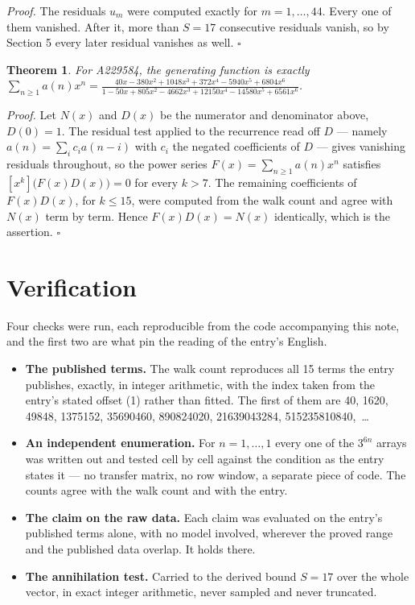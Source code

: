 \documentclass[11pt]{article}
\newtheorem{theorem}{Theorem}
\theoremstyle{definition}
\begin{document}
{\itshape Proof.} The residuals $u_m$ were computed exactly for $m = 1,\dots,44$. Every one of them vanished. After it, more than $S = 17$ consecutive residuals vanish, so by Section 5 every later residual vanishes as well. $\square$

\begin{theorem} For A229584, the generating function is exactly $\sum_{n\ge 1} a(n)x^n = \frac{40x - 380x^{2} + 1048x^{3} + 372x^{4} - 5940x^{5} + 6804x^{6}}{1 - 50x + 805x^{2} - 4662x^{3} + 12150x^{4} - 14580x^{5} + 6561x^{6}}$.\end{theorem}

{\itshape Proof.} Let $N(x)$ and $D(x)$ be the numerator and denominator above, $D(0)=1$. The residual test applied to the recurrence read off $D$ --- namely $a(n) = \sum_i c_i a(n-i)$ with $c_i$ the negated coefficients of $D$ --- gives vanishing residuals throughout, so the power series $F(x)=\sum_{n\ge 1}a(n)x^n$ satisfies $[x^k]\bigl(F(x)D(x)\bigr) = 0$ for every $k > 7$. The remaining coefficients of $F(x)D(x)$, for $k \le 15$, were computed from the walk count and agree with $N(x)$ term by term. Hence $F(x)D(x) = N(x)$ identically, which is the assertion. $\square$

\section{Verification}

Four checks were run, each reproducible from the code accompanying this note, and the first two are what pin the reading of the entry's English.

\begin{itemize}

\item {\bfseries The published terms.} The walk count reproduces all 15 terms the entry publishes, exactly, in integer arithmetic, with the index taken from the entry's stated offset (1) rather than fitted. The first of them are 40, 1620, 49848, 1375152, 35690460, 890824020, 21639043284, 515235810840,~\dots

\item {\bfseries An independent enumeration.} For $n = 1,\dots,1$ every one of the $3^{6n}$ arrays was written out and tested cell by cell against the condition as the entry states it --- no transfer matrix, no row window, a separate piece of code. The counts agree with the walk count and with the entry.

\item {\bfseries The claim on the raw data.} Each claim was evaluated on the entry's published terms alone, with no model involved, wherever the proved range and the published data overlap. It holds there.

\item {\bfseries The annihilation test.} Carried to the derived bound $S = 17$ over the whole vector, in exact integer arithmetic, never sampled and never truncated.

\end{itemize}
\end{document}
